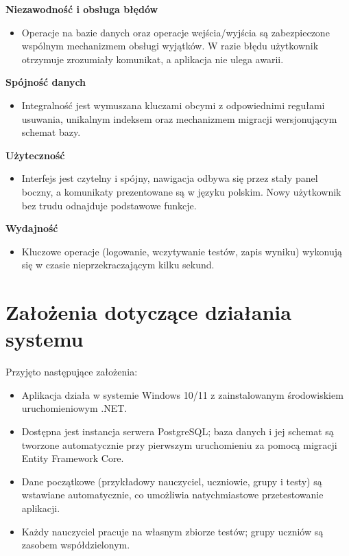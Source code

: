 \textbf{Niezawodność i obsługa błędów}
\begin{itemize}
  \item Operacje na bazie danych oraz operacje wejścia/wyjścia są zabezpieczone wspólnym mechanizmem
        obsługi wyjątków. W razie błędu użytkownik otrzymuje zrozumiały komunikat, a aplikacja nie
        ulega awarii.
\end{itemize}

\textbf{Spójność danych}
\begin{itemize}
  \item Integralność jest wymuszana kluczami obcymi z odpowiednimi regułami usuwania, unikalnym
        indeksem oraz mechanizmem migracji wersjonującym schemat bazy.
\end{itemize}

\textbf{Użyteczność}
\begin{itemize}
  \item Interfejs jest czytelny i spójny, nawigacja odbywa się przez stały panel boczny, a komunikaty
        prezentowane są w języku polskim. Nowy użytkownik bez trudu odnajduje podstawowe funkcje.
\end{itemize}

\textbf{Wydajność}
\begin{itemize}
  \item Kluczowe operacje (logowanie, wczytywanie testów, zapis wyniku) wykonują się w czasie
        nieprzekraczającym kilku sekund.
\end{itemize}

\section{Założenia dotyczące działania systemu}
\label{sec:zalozeniaSystemu}

Przyjęto następujące założenia:

\begin{itemize}
  \item Aplikacja działa w systemie Windows 10/11 z zainstalowanym środowiskiem uruchomieniowym .NET.
  \item Dostępna jest instancja serwera PostgreSQL; baza danych i jej schemat są tworzone automatycznie
        przy pierwszym uruchomieniu za pomocą migracji Entity Framework Core.
  \item Dane początkowe (przykładowy nauczyciel, uczniowie, grupy i testy) są wstawiane automatycznie,
        co umożliwia natychmiastowe przetestowanie aplikacji.
  \item Każdy nauczyciel pracuje na własnym zbiorze testów; grupy uczniów są zasobem współdzielonym.
\end{itemize}
